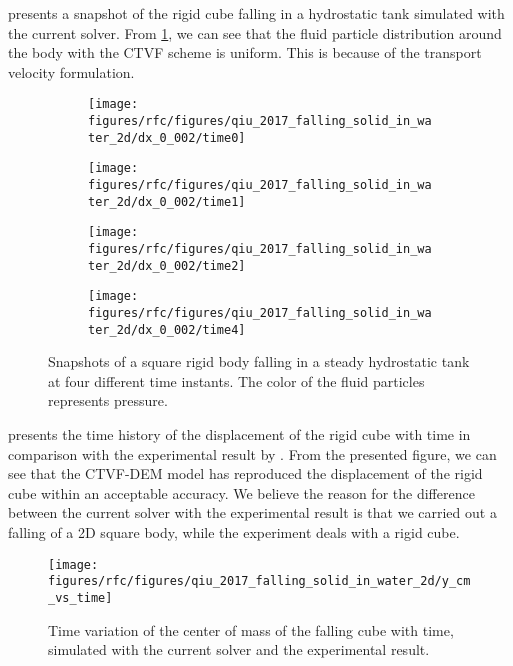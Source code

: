  presents a snapshot of the rigid
cube falling in a hydrostatic tank simulated with the current solver. From
\cref{fig:snapshots-falling-solid-in-water}, we can see that the fluid particle
distribution around the body with the CTVF scheme is uniform. This is because of
the transport velocity formulation.
\begin{figure}[!htpb]
  \centering
  \begin{subfigure}{0.48\textwidth}
    \centering
    \texttt{[image: figures/rfc/figures/qiu\_2017\_falling\_solid\_in\_water\_2d/dx\_0\_002/time0]}
  \end{subfigure}
  \begin{subfigure}{0.48\textwidth}
    \centering
    \texttt{[image: figures/rfc/figures/qiu\_2017\_falling\_solid\_in\_water\_2d/dx\_0\_002/time1]}
  \end{subfigure}

  \begin{subfigure}{0.48\textwidth}
    \centering
    \texttt{[image: figures/rfc/figures/qiu\_2017\_falling\_solid\_in\_water\_2d/dx\_0\_002/time2]}
  \end{subfigure}
  \begin{subfigure}{0.48\textwidth}
    \centering
    \texttt{[image: figures/rfc/figures/qiu\_2017\_falling\_solid\_in\_water\_2d/dx\_0\_002/time4]}
  \end{subfigure}
  \caption{Snapshots of a square rigid body falling in a steady hydrostatic tank
    at four different time instants. The color of the fluid particles represents
    pressure. }
\label{fig:snapshots-falling-solid-in-water}
\end{figure}
 presents the time history of the
displacement of the rigid cube with time in comparison with the experimental
result by \textcite{wu_two-way_2014}. From the presented figure, we can see that the
CTVF-DEM model has reproduced the displacement of the rigid cube within an
acceptable accuracy. We believe the reason for the difference between the
current solver with the experimental result is that we carried out a falling of
a 2D square body, while the experiment deals with a rigid cube.
\begin{figure}[!htpb]
  \centering
  \texttt{[image: figures/rfc/figures/qiu\_2017\_falling\_solid\_in\_water\_2d/y\_cm\_vs\_time]}
  \caption{Time variation of the center of mass of the falling cube with time,
    simulated with the current solver and the experimental result.}
\label{fig:disp-falling-solid-in-water}
\end{figure}



